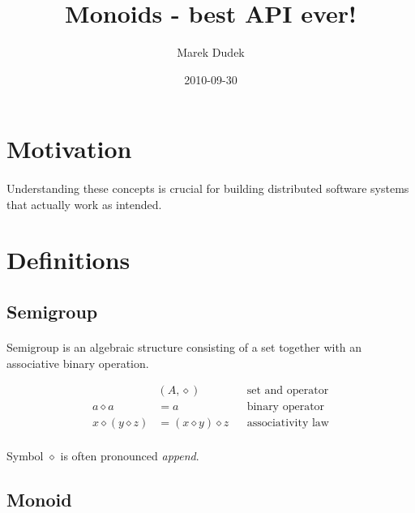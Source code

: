 \documentclass{article}
\title{Monoids - best API ever!}
\date{2010-09-30}
\author{Marek Dudek}
\begin{document}
\maketitle

\newpage
\tableofcontents

\newpage
{}

\section{Motivation}

    \paragraph{}
    Understanding these concepts is crucial for building distributed software systems that actually work as intended.

\section{Definitions}

\subsection{Semigroup}

    \paragraph{}
    Semigroup is an algebraic structure consisting of a set together with an associative binary operation.

    \begin{align*}
        &(A, \diamond) && \text{set and operator} \\
        a \diamond a &= a && \text{binary operator} \\
        x \diamond (y \diamond z) &= (x \diamond y) \diamond z && \text{associativity law}
    \end{align*}

    \paragraph{}
    Symbol $\diamond$ is often pronounced \textit{append}.

\subsection{Monoid}
\end{document}
